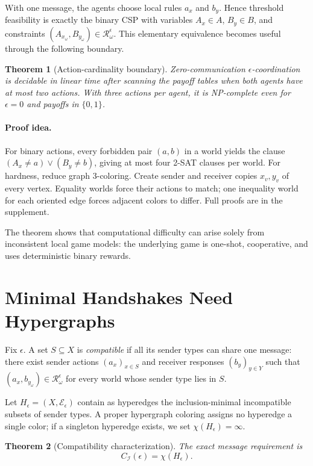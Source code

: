 \documentclass[letterpaper]{article} %
\newtheorem{theorem}{Theorem}
\newcommand{\Ceps}{C}
\newcommand{\Rset}{\mathcal{R}}
\newcommand{\I}{\mathcal{I}}
\begin{document}
With one message, the agents choose local rules $a_x$ and $b_y$. Hence
threshold feasibility is exactly the binary CSP with variables
$A_x\in A$, $B_y\in B$, and constraints
$(A_{x_\omega},B_{y_\omega})\in\Rset_\omega^\epsilon$.
This elementary equivalence becomes useful through the following boundary.

\begin{theorem}[Action-cardinality boundary]\label{thm:boundary}
Zero-communication $\epsilon$-coordination is decidable in linear time after
scanning the payoff tables when both agents have at most two actions. With
three actions per agent, it is NP-complete even for $\epsilon=0$ and payoffs in
$\{0,1\}$.
\end{theorem}

\paragraph{Proof idea.}
For binary actions, every forbidden pair $(a,b)$ in a world yields the clause
$(A_x\ne a)\lor(B_y\ne b)$, giving at most four 2-SAT clauses per world. For
hardness, reduce graph 3-coloring. Create sender and receiver copies $x_v,y_v$
of every vertex. Equality worlds force their actions to match; one inequality
world for each oriented edge forces adjacent colors to differ. Full proofs are
in the supplement.

The theorem shows that computational difficulty can arise solely from
inconsistent local game models: the underlying game is one-shot, cooperative,
and uses deterministic binary rewards.

\section{Minimal Handshakes Need Hypergraphs}

Fix $\epsilon$. A set $S\subseteq X$ is \emph{compatible} if all its sender
types can share one message: there exist sender actions $(a_x)_{x\in S}$ and
receiver responses $(b_y)_{y\in Y}$ such that
$(a_x,b_{y_\omega})\in\Rset_\omega^\epsilon$ for every world whose sender type
lies in $S$.

Let $H_\epsilon=(X,\mathcal E_\epsilon)$ contain as hyperedges the
inclusion-minimal incompatible subsets of sender types. A proper hypergraph
coloring assigns no hyperedge a single color; if a singleton hyperedge exists,
we set $\chi(H_\epsilon)=\infty$.

\begin{theorem}[Compatibility characterization]\label{thm:hypergraph}
The exact message requirement is
\[
\Ceps_\I(\epsilon)=\chi(H_\epsilon).
\]
\end{theorem}
\end{document}
